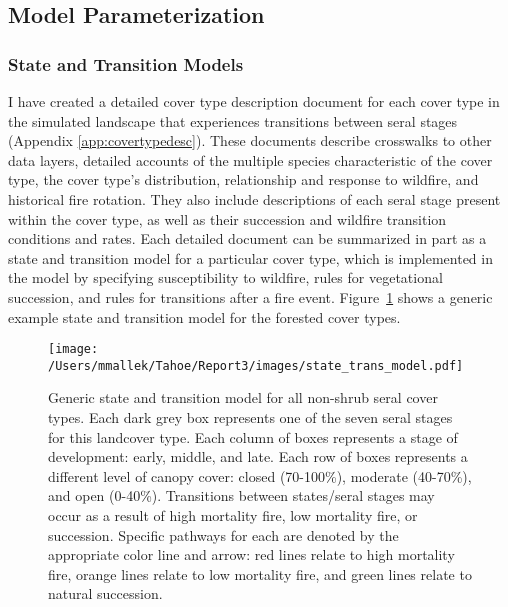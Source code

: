 \subsection{Model Parameterization}
\label{subsec:hrvmodelparam}

\subsubsection*{State and Transition Models}
I have created a detailed cover type description document for each cover type in the simulated landscape that experiences transitions between seral stages (Appendix \ref{app:covertypedesc}). These documents describe crosswalks to other data layers, detailed accounts of the multiple species characteristic of the cover type, the cover type's distribution, relationship and response to wildfire, and historical fire rotation. They also include descriptions of each seral stage present within the cover type, as well as their succession and wildfire transition conditions and rates. Each detailed document can be summarized in part as a state and transition model for a particular cover type, which is implemented in the model by specifying susceptibility to wildfire, rules for vegetational succession, and rules for transitions after a fire event. Figure~\ref{transmodel} shows a generic example state and transition model for the forested cover types.

\begin{figure}[htbp]
\centering
\texttt{[image: /Users/mmallek/Tahoe/Report3/images/state\_trans\_model.pdf]}
\caption{Generic state and transition model for all non-shrub seral cover types. Each dark grey box represents one of the seven seral stages for this landcover type. Each column of boxes represents a stage of development: early, middle, and late. Each row of boxes represents a different level of canopy cover: closed (70-100\%), moderate (40-70\%), and open (0-40\%). Transitions between states/seral stages may occur as a result of high mortality fire, low mortality fire, or succession. Specific pathways for each are denoted by the appropriate color line and arrow: red lines relate to high mortality fire, orange lines relate to low mortality fire, and green lines relate to natural succession.} 
\label{transmodel}
\end{figure}


